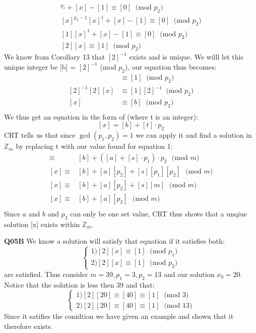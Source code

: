 \documentclass[11pt]{article}
\begin{document}
\begin{align*}
 [x]^{p_2} + [x] - [1] \equiv [0] \ \text{ (mod $p_2$)} \\
 [x]^{ p_2 -1}[x]^1 + [x] - [1] \equiv [0]  \ \text{ (mod $p_2$)} \\
 [1][x]^1 + [x] - [1] \equiv [0]  \ \text{ (mod $p_2$)} \\
 [2][x]  \equiv [1]  \ \text{ (mod $p_2$)} 
\end{align*}
We know from Corollary 13 that $[2]^{-1}$ exists and is unique. We willl let this unique integer be [b] = $[2]^{-1}$ (mod $p_2$), our equation thus becomes:
\begin{align*}
 [2][x] & \equiv [1]  \ \text{ (mod $p_2$)} \\
 [2]^{-1}[2][x] & \equiv [1][2]^{-1} \ \text{ (mod $p_2$)} \\
 [x] & \equiv [b] \ \text{ (mod $p_2$)} \\
\end{align*}
We thus get an equation in the form of (where t is an integer):
\[ [x] = [b] + [t] \cdot p_2 \]
CRT tells us that since $\gcd(p_1,p_2) = 1$ we can apply it and find a solution in $\mathbb{Z}_m$ by replacing t with our value found for equation 1:
\begin{align*}
 [x] \equiv & [b] + ([a] + [s] \cdot p_1 ) \cdot p_2 \ \ \  \text{(mod $m$)}\\
 [x] \equiv & [b] + [a][p_2]+ [s][p_1][p_2] \ \ \  \text{(mod $m$)}\\
 [x] \equiv & [b] + [a][p_2]+ [s][m] \ \ \  \text{(mod $m$)}\\
 [x] \equiv & [b] + [a][p_2]\ \ \  \text{(mod $m$)}\\
\end{align*}
Since $a$ and $b$ and $p_2$ can only be one set value, CRT thus shows that a unqiue solution [x] exists within $\mathbb{Z}_m$.

\textbf{Q05B} We know a solution will satisfy that equation if it satisfies both:
$$
\begin{cases}
1)  [2][x] \equiv [1]  \ \text{ (mod $p_1$)} \\
2)  [2][x]  \equiv [1]  \ \text{ (mod $p_2$)} 
\end{cases}
$$
are satisfied. Thus consider $m= 39, p_1 = 3, p_2 = 13$ and our solution $x_0=20$. Notice that the solution is less then 39 and that:
$$
\begin{cases}
1)  [2][20] \equiv [40] \equiv [1]  \ \text{ (mod $3$)} \\
2)  [2][20] \equiv [40] \equiv [1]  \ \text{ (mod $13$)} 
\end{cases}
$$
Since it satifies the conidtion we have given an example and shown that it therefore exists.
\end{document}
